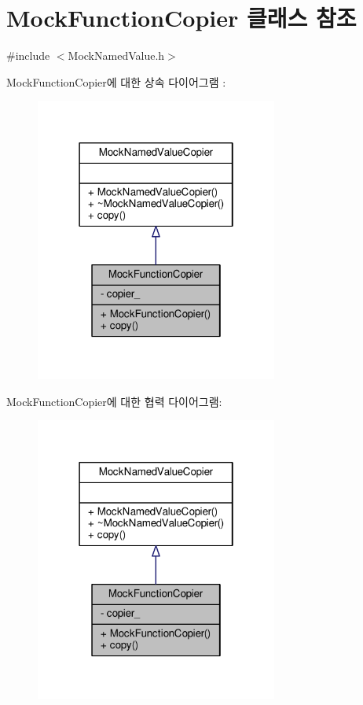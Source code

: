 \hypertarget{class_mock_function_copier}{}\section{Mock\+Function\+Copier 클래스 참조}
\label{class_mock_function_copier}


{\ttfamily \#include $<$Mock\+Named\+Value.\+h$>$}



Mock\+Function\+Copier에 대한 상속 다이어그램 \+: 
\nopagebreak
\begin{figure}[H]
\begin{center}
\leavevmode
\includegraphics[width=226pt]{class_mock_function_copier__inherit__graph}
\end{center}
\end{figure}


Mock\+Function\+Copier에 대한 협력 다이어그램\+:
\nopagebreak
\begin{figure}[H]
\begin{center}
\leavevmode
\includegraphics[width=226pt]{class_mock_function_copier__coll__graph}
\end{center}
\end{figure}
